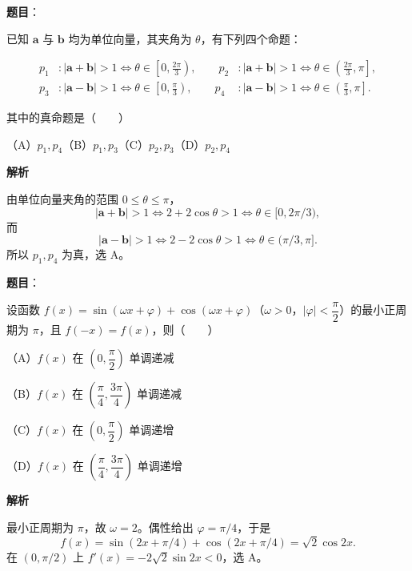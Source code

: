 \begin{answer}

\textbf{题目}：

已知 $\boldsymbol a$ 与 $\boldsymbol b$ 均为单位向量，其夹角为 $\theta$，有下列四个命题：

\nopagebreak[4]
\[
\begin{aligned}
p_1 &: |\boldsymbol a+\boldsymbol b|>1\Longleftrightarrow \theta\in\left[0,\frac{2\pi}{3}\right),\qquad
p_2 &: |\boldsymbol a+\boldsymbol b|>1\Longleftrightarrow \theta\in\left(\frac{2\pi}{3},\pi\right],\\
p_3 &: |\boldsymbol a-\boldsymbol b|>1\Longleftrightarrow \theta\in\left[0,\frac\pi3\right),\qquad
p_4 &: |\boldsymbol a-\boldsymbol b|>1\Longleftrightarrow \theta\in\left(\frac\pi3,\pi\right].
\end{aligned}
\]

其中的真命题是\mbox{（　　）}

（A）$p_1,p_4$\quad（B）$p_1,p_3$\quad（C）$p_2,p_3$\quad（D）$p_2,p_4$

\textbf{解析}

由单位向量夹角的范围 $0\leq\theta\leq\pi$，
\nopagebreak[4]
\[
|\boldsymbol a+\boldsymbol b|>1\iff 2+2\cos\theta>1
\iff \theta\in[0,2\pi/3),
\]
而
\nopagebreak[4]
\[
|\boldsymbol a-\boldsymbol b|>1\iff 2-2\cos\theta>1
\iff \theta\in(\pi/3,\pi].
\]
所以 $p_1,p_4$ 为真，选 A。


\end{answer}
\begin{answer}

\textbf{题目}：

设函数 $f(x)=\sin(\omega x+\varphi)+\cos(\omega x+\varphi)$（$\omega>0$，$|\varphi|<\dfrac\pi2$）的最小正周期为 $\pi$，且 $f(-x)=f(x)$，则\mbox{（　　）}

（A）$f(x)$ 在 $\left(0,\dfrac\pi2\right)$ 单调递减

（B）$f(x)$ 在 $\left(\dfrac\pi4,\dfrac{3\pi}4\right)$ 单调递减

（C）$f(x)$ 在 $\left(0,\dfrac\pi2\right)$ 单调递增

（D）$f(x)$ 在 $\left(\dfrac\pi4,\dfrac{3\pi}4\right)$ 单调递增

\textbf{解析}

最小正周期为 $\pi$，故 $\omega=2$。偶性给出 $\varphi=\pi/4$，于是
\nopagebreak[4]
\[
f(x)=\sin(2x+\pi/4)+\cos(2x+\pi/4)=\sqrt2\cos2x.
\]
在 $(0,\pi/2)$ 上 $f'(x)=-2\sqrt2\sin2x<0$，选 A。


\end{answer}
